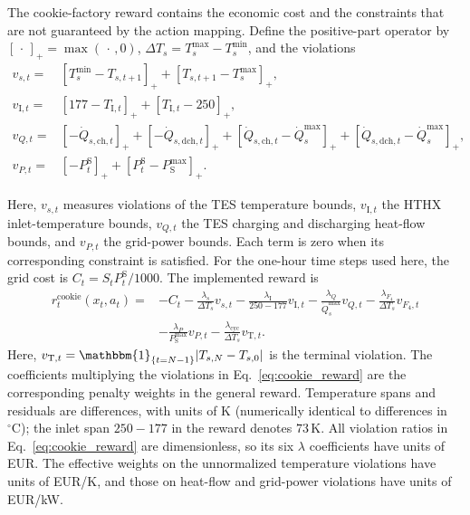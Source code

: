 \documentclass[12pt]{article}
\begin{document}
\begin{samepage}
The cookie-factory reward contains the economic cost and the constraints that
are not guaranteed by the action mapping. Define the positive-part operator by
$[\,\cdot\,]_+=\max(\,\cdot\,,0)$,
$\Delta T_s=T_s^{\max}-T_s^{\min}$, and the violations
\begin{align*}
v_{s,t}={}&[T_s^{\min}-T_{s,t+1}]_+
          +[T_{s,t+1}-T_s^{\max}]_+,\\
v_{\mathrm I,t}={}&[177-T_{\mathrm{I},t}]_+
          +[T_{\mathrm{I},t}-250]_+,\\
v_{Q,t}={}&[-\dot{Q}_{s,\mathrm{ch},t}]_+
          +[-\dot{Q}_{s,\mathrm{dch},t}]_+
          +[\dot{Q}_{s,\mathrm{ch},t}-\dot Q_s^{\max}]_+
          +[\dot{Q}_{s,\mathrm{dch},t}-\dot Q_s^{\max}]_+,\\
v_{P,t}={}&[-P_t^{\mathrm S}]_+
          +[P_t^{\mathrm S}-P_{\mathrm S}^{\max}]_+.
\end{align*}
\end{samepage}
Here, $v_{s,t}$ measures violations of the TES temperature bounds,
$v_{\mathrm I,t}$ the HTHX inlet-temperature bounds, $v_{Q,t}$ the TES
charging and discharging heat-flow bounds, and $v_{P,t}$ the grid-power bounds.
Each term is zero when its corresponding constraint is satisfied.
For the one-hour time steps used here, the grid cost is
$C_t=S_tP_t^{\mathrm S}/1000$. The implemented reward is
\begin{align}
r_t^{\mathrm{cookie}}(x_t,a_t)={}&-C_t
-\frac{\lambda_s}{\Delta T_s}v_{s,t}
-\frac{\lambda_{\mathrm I}}{250-177}v_{\mathrm I,t}
-\frac{\lambda_Q}{\dot Q_s^{\max}}v_{Q,t}
-\frac{\lambda_{F_4}}{\Delta T_s}v_{F_4,t}
\nonumber\\
&-\frac{\lambda_P}{P_{\mathrm S}^{\max}}v_{P,t}
-\frac{\lambda_{\mathrm{cyc}}}{\Delta T_s}v_{\mathrm T,t}.
\label{eq:cookie_reward}
\end{align}
Here, $v_{\mathrm T,t}=\mathbbm{1}_{\{t=N-1\}}|T_{s,N}-T_{s,0}|$ is the
terminal violation. The coefficients multiplying the violations in
Eq.~\eqref{eq:cookie_reward} are the corresponding penalty weights in the
general reward.
Temperature spans and residuals are differences, with units of K
(numerically identical to differences in ${}^\circ\mathrm C$); the inlet
span $250-177$ in the reward denotes $73\,\mathrm K$.
All violation ratios in Eq.~\eqref{eq:cookie_reward} are dimensionless,
so its six $\lambda$ coefficients have units of EUR. The effective weights
on the unnormalized temperature violations have units of EUR/K, and those
on heat-flow and grid-power violations have units of EUR/kW.
\end{document}
